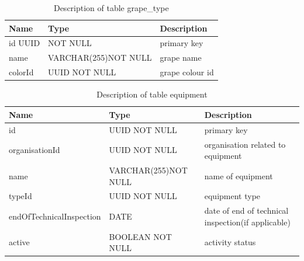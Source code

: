 \begin{table}[th]
	\centering
	\caption{Description of table grape\_type}
	\begin{tabular}{|m{}|m{}|m{}|}
		\hline
		Name & Type & Description  \\
		\hline
		id UUID & NOT NULL & primary key\\
		\hline
		name & VARCHAR(255)\newline NOT NULL & grape name\\
		\hline
		colorId & UUID NOT NULL & grape colour id\\
		\hline
	\end{tabular}
\end{table}
\begin{table}[th]
	\centering
	\caption{Description of table equipment}
	\begin{tabular}{|m{}|m{}|m{}|}
		\hline
		Name & Type & Description  \\
		\hline
		id & UUID NOT NULL & primary key \\
		\hline
		organisationId & UUID NOT NULL & organisation related to equipment \\
		\hline
		name & VARCHAR(255)\newline NOT NULL & name of equipment \\
		\hline
		typeId & UUID NOT NULL & equipment type \\
		\hline
		endOfTechnicalInspection & DATE & date of end of technical inspection(if applicable)\\
		\hline
		active & BOOLEAN NOT NULL & activity status \\
		\hline
	\end{tabular}
\end{table}
